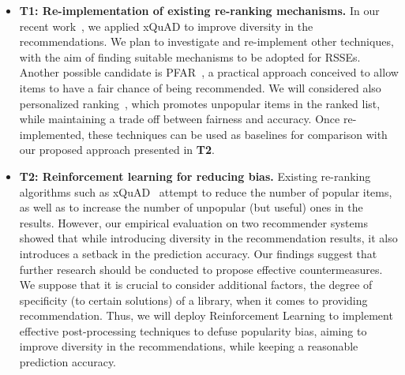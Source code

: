 \begin{itemize}
	\item \textbf{T1: Re-implementation of existing re-ranking mechanisms.} In our recent work~\cite{10174041}, we applied xQuAD \cite{10.1145/1772690.1772780} %
	to improve diversity in the recommendations. %
	We plan to investigate and re-implement other %
	techniques, with the aim of finding suitable mechanisms to be adopted for RSSEs. Another possible candidate is PFAR~\cite{DBLP:journals/corr/abs-1809-02921}, a practical approach conceived to allow items to have a fair chance of being recommended. We will considered also personalized ranking~\cite{DBLP:conf/flairs/AbdollahpouriBM19}, which promotes unpopular items in the ranked list, while maintaining a trade off between fairness and accuracy. Once re-implemented, these techniques can be used as baselines for comparison with our proposed approach presented in \textbf{T2}. %
	\item \textbf{T2: Reinforcement learning for reducing bias.} Existing re-ranking algorithms such as xQuAD~\cite{10.1145/1772690.1772780} %
	attempt to reduce the number of popular items, as well as to increase the number of unpopular (but useful) ones in the results. However, our empirical evaluation on two recommender systems showed that while introducing diversity in the recommendation results, it also introduces a setback in the prediction accuracy. Our findings suggest that %
	further research should be conducted to propose effective countermeasures. We suppose that it is crucial to consider %
	additional factors, \eg the degree of specificity (to certain solutions) of a library, when it comes to providing recommendation. Thus, we will deploy Reinforcement Learning to implement effective post-processing techniques to defuse popularity bias, aiming to improve diversity in the recommendations, while keeping a reasonable prediction accuracy. %
\end{itemize}
